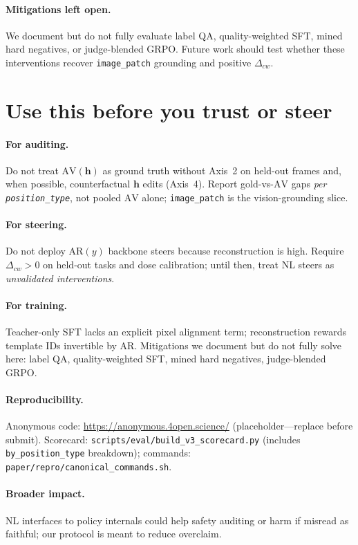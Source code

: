 \documentclass{article}
\newcommand{\AV}{\ensuremath{\mathrm{AV}}}
\newcommand{\AR}{\ensuremath{\mathrm{AR}}}
\newcommand{\hvec}{\mathbf{h}}
\newcommand{\code}[1]{\texttt{\small #1}}
\begin{document}
\paragraph{Mitigations left open.}
We document but do not fully evaluate label QA, quality-weighted SFT, mined
hard negatives, or judge-blended GRPO.
Future work should test whether these interventions recover
\code{image\_patch} grounding and positive \(\Delta_{cw}\).

\section{Use this before you trust or steer}
\label{sec:conclusion}

\paragraph{For auditing.}
Do not treat \(\AV(\hvec)\) as ground truth without Axis~2 on held-out
frames and, when possible, counterfactual \(\hvec\) edits (Axis~4).
Report gold-vs-\(\AV\) gaps \emph{per \code{position\_type}}, not pooled
\(\AV\) alone; \code{image\_patch} is the vision-grounding slice.

\paragraph{For steering.}
Do not deploy \(\AR(y)\) backbone steers because reconstruction is high.
Require \(\Delta_{cw} > 0\) on held-out tasks and dose calibration;
until then, treat NL steers as \emph{unvalidated interventions}.

\paragraph{For training.}
Teacher-only SFT lacks an explicit pixel alignment term; reconstruction
rewards template IDs invertible by \(\AR\).
Mitigations we document but do not fully solve here: label QA,
quality-weighted SFT, mined hard negatives, judge-blended GRPO.

\paragraph{Reproducibility.}
Anonymous code: \url{https://anonymous.4open.science/} (placeholder---replace
before submit).
Scorecard: \code{scripts/eval/build\_v3\_scorecard.py} (includes
\code{by\_position\_type} breakdown);
commands: \code{paper/repro/canonical\_commands.sh}.

\paragraph{Broader impact.}
NL interfaces to policy internals could help safety auditing or harm if
misread as faithful; our protocol is meant to reduce overclaim.


\end{document}
